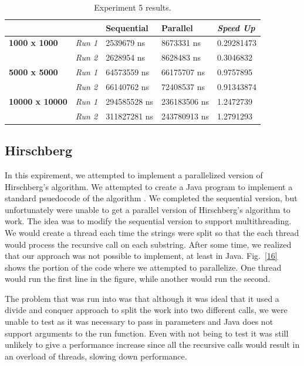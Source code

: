 \documentclass[conference]{IEEEtran}
\begin{document}
\begin{table}[]
\caption{Experiment 5 results.}
\label{tab:table5}
\begin{tabular}{|l|l|l|l|l|}
\hline
               & \textbf{}      & \textbf{Sequential} & \textbf{Parallel} & \textit{\textbf{Speed Up}} \\ \hline
\textbf{1000 x 1000}   & \textit{Run 1} & 2539679 ns   & 8673331 ns   & 0.29281473 \\ \hline
              & \textit{Run 2} & 2628954 ns   & 8628483 ns   & 0.3046832  \\ \hline
\textbf{5000 x 5000}   & \textit{Run 1} & 64573559 ns  & 66175707 ns  & 0.9757895  \\ \hline
              & \textit{Run 2} & 66140762 ns  & 72408537 ns  & 0.91343874 \\ \hline
\textbf{10000 x 10000} & \textit{Run 1} & 294585528 ns & 236183506 ns & 1.2472739  \\ \hline
              & \textit{Run 2} & 311827281 ns & 243780913 ns & 1.2791293  \\ \hline
\end{tabular}
\end{table}

\subsection{Hirschberg}
In this expirement, we attempted to implement a parallelized version of Hirschberg's algorithm. We attempted to create a Java program to implement a standard psuedocode of the algorithm \cite{hirschbergPsuedoCode}. We completed the sequential version, but unfortunately were unable to get a parallel version of Hirschberg's algorithm to work. The idea was to modify the sequential version to support multithreading. We would create a thread each time the strings were split so that the each thread would process the recursive call on each substring. After some time, we realized that our approach was not possible to implement, at least in Java. Fig.~\ref{16} shows the portion of the code where we attempted to parallelize. One thread would run the first line in the figure, while another would run the second.

The problem that was run into was that although it was ideal that it used a divide and conquer approach to split the work into two different calls, we were unable to test as it was necessary to pass in parameters and Java does not support arguments to the run function. Even with not being to test it was still unlikely to give a performance increase since all the recursive calls would result in an overload of threads, slowing down performance.
\end{document}
